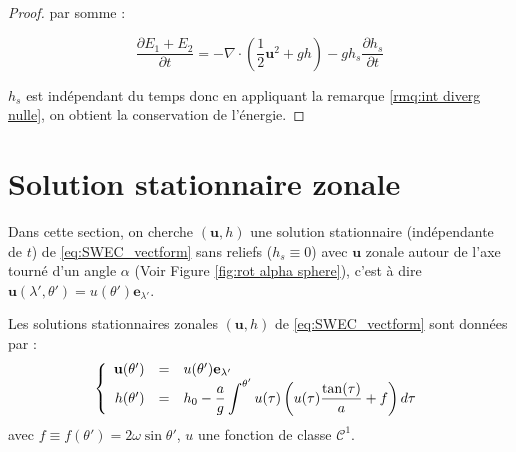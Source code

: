 \begin{proof}
par somme :

$$
\dfrac{\partial E_1 + E_2}{\partial t} = - \nabla \cdot \left( \dfrac{1}{2} \mathbf{u}^2 + gh \right) - g h_s \dfrac{\partial h_s}{\partial t} 
$$

$h_s$ est indépendant du temps donc en appliquant la remarque \ref{rmq:int diverg nulle}, on obtient la conservation de l'énergie.
\end{proof}

\section{Solution stationnaire zonale}

Dans cette section, on cherche $(\mathbf{u},h)$ une solution stationnaire (indépendante de $t$) de \eqref{eq:SWEC_vectform} sans reliefs ($h_s \equiv 0$) avec $\mathbf{u}$ zonale autour de l'axe tourné d'un angle $\alpha$ (Voir Figure \ref{fig:rot alpha sphere}), c'est à dire $\mathbf{u}(\lambda', \theta') = u(\theta') \mathbf{e}_{\lambda'}$.

\begin{proposition}
Les solutions stationnaires zonales $(\mathbf{u},h)$ de \eqref{eq:SWEC_vectform} sont données par :
\begin{equation}
\left\lbrace
\begin{array}{rcl}
\mathbf{u}(\theta') & = & u(\theta') \mathbf{e}_{\lambda'}\\
h(\theta') & = & h_0 - \dfrac{a}{g} \displaystyle\int^{\theta'} u(\tau) \left( u(\tau) \dfrac{\tan (\tau)}{a} + f \right) d\tau\\
\end{array}
\right.
\label{eq:sol. stationaire zonale de swe}
\end{equation}
avec $f \equiv f(\theta') = 2 \omega \sin \theta'$, $u$ une fonction de classe $\mathcal{C}^1$.
\end{proposition}

